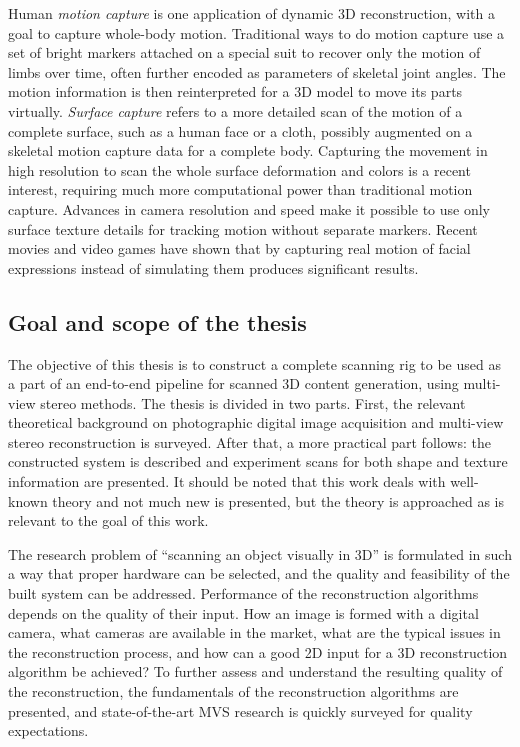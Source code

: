 
Human \emph{motion capture} is one application of dynamic 3D reconstruction, with a goal to capture whole-body motion.
Traditional ways to do motion capture use a set of bright markers attached on a special suit to recover only the motion of limbs over time, often further encoded as parameters of skeletal joint angles.
The motion information is then reinterpreted for a 3D model to move its parts virtually.
\emph{Surface capture} refers to a more detailed scan of the motion of a complete surface, such as a human face or a cloth, possibly augmented on a skeletal motion capture data for a complete body.
Capturing the movement in high resolution to scan the whole surface deformation and colors is a recent interest, requiring much more computational power than traditional motion capture.
Advances in camera resolution and speed make it possible to use only surface texture details for tracking motion without separate markers.
Recent movies and video games have shown that by capturing real motion of facial expressions instead of simulating them produces significant results.


\subsection{Goal and scope of the thesis}


The objective of this thesis is to construct a complete scanning rig to be used as a part of an end-to-end pipeline for scanned 3D content generation, using multi-view stereo methods.
The thesis is divided in two parts.
First, the relevant theoretical background on photographic digital image acquisition and multi-view stereo reconstruction is surveyed.
After that, a more practical part follows: the constructed system is described and experiment scans for both shape and texture information are presented.
It should be noted that this work deals with well-known theory and not much new is presented, but the theory is approached as is relevant to the goal of this work.


The research problem of ``scanning an object visually in 3D'' is formulated in such a way that proper hardware can be selected, and the quality and feasibility of the built system can be addressed.
Performance of the reconstruction algorithms depends on the quality of their input.
How an image is formed with a digital camera, what cameras are available in the market, what are the typical issues in the reconstruction process, and how can a good 2D input for a 3D reconstruction algorithm be achieved?
To further assess and understand the resulting quality of the reconstruction, the fundamentals of the reconstruction algorithms are presented, and state-of-the-art MVS research is quickly surveyed for quality expectations.

